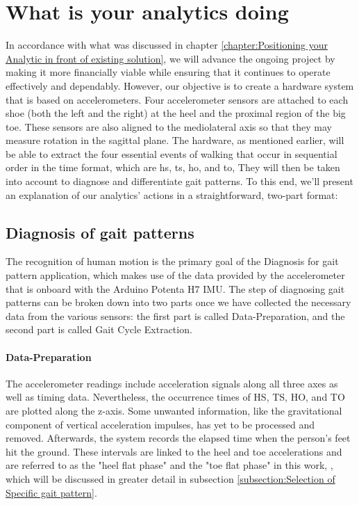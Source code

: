 \chapter{What is your analytics doing}

In accordance with what was discussed in chapter \ref{chapter:Positioning your Analytic in front of existing solution}, we will advance the ongoing project by making it more financially viable while ensuring that it continues to operate effectively and dependably. However, our objective is to create a hardware system that is based on accelerometers. Four accelerometer sensors are attached to each shoe (both the left and the right) at the heel and the proximal region of the big toe. These sensors are also aligned to the mediolateral axis so that they may measure rotation in the sagittal plane. The hardware, as mentioned earlier, will be able to extract the four essential events of walking that occur in sequential order in the time format, which are \ac{hs}, \ac{ts}, \ac{ho}, and \ac{to}, They will then be taken into account to diagnose and differentiate gait patterns. To this end, we'll present an explanation of our analytics' actions in a straightforward, two-part format:

\section{Diagnosis of gait patterns}
The recognition of human motion is the primary goal of the Diagnosis for gait pattern application, which makes use of the data provided by the accelerometer that is onboard with the Arduino Potenta H7 IMU. The step of diagnosing gait patterns can be broken down into two parts once we have collected the necessary data from the various sensors: the first part is called Data-Preparation, and the second part is called Gait Cycle Extraction.

\subsubsection{Data-Preparation}

The accelerometer readings include acceleration signals along all three axes as well as timing data. Nevertheless, the occurrence times of HS, TS, HO, and TO are plotted along the z-axis. Some unwanted information, like the gravitational component of vertical acceleration impulses, has yet to be processed and removed. Afterwards, the system records the elapsed time when the person's feet hit the ground. These intervals are linked to the heel and toe accelerations and are referred to as the "heel flat phase" and the "toe flat phase" in this work, , which will be discussed in greater detail in subsection \ref{subsection:Selection of Specific gait pattern}.

